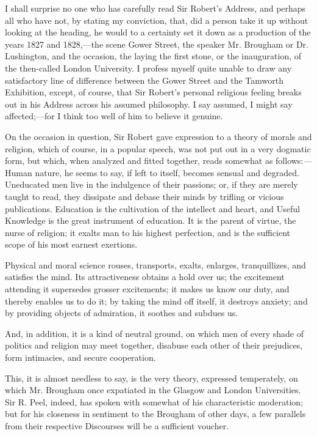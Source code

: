 I shall surprise no one who has carefully read Sir Robert's
Address, and perhaps all who have not, by stating my conviction, that,
did a person take it up without looking at the heading, he would to a
certainty set it down as a production of the years 1827 and 1828,—the
scene Gower Street, the speaker Mr. Brougham or Dr. Lushington, and
the occasion, the laying the first stone, or the inauguration, of the
then-called London University. I profess myself quite unable to draw
any satisfactory line of difference between the Gower Street and the
Tamworth Exhibition, except, of course, that Sir Robert's personal
religious feeling breaks out in his Address across his assumed
philosophy. I say assumed, I might say affected;—for I think too
well of him to believe it genuine.

On the occasion in question, Sir Robert gave expression to a theory
of morals and religion, which of course, in a popular speech, was not
put out in a very dogmatic form, but which, when analyzed and fitted
together, reads somewhat as follows:\emph{—}Human nature, he seems
to say, if left to itself, becomes sensual and degraded. Uneducated
men live in the indulgence of their passions; or, if they are merely
taught to read, they dissipate and debase their minds by trifling or
vicious publications. Education is the cultivation of the intellect
and heart, and Useful Knowledge is the great instrument of education.
It is the parent of virtue, the nurse of religion; it exalts man to
his highest perfection, and is the sufficient scope of his most
earnest exertions.

Physical and moral science rouses, transports, exalts, enlarges,
tranquillizes, and satisfies the mind. Its attractiveness obtains a
hold over us; the excitement attending it supersedes grosser
excitements; it makes us know our duty, and thereby enables us
to do it; by taking the mind off itself, it destroys anxiety; and by
providing objects of admiration, it soothes and subdues us.

And, in addition, it is a kind of neutral ground, on which men of
every shade of politics and religion may meet together, disabuse each
other of their prejudices, form intimacies, and secure cooperation.

This, it is almost needless to say, is the very theory, expressed
temperately, on which Mr. Brougham once expatiated in the Glasgow and
London Universities. Sir R. Peel, indeed, has spoken with somewhat of
his characteristic moderation; but for his closeness in sentiment to
the Brougham of other days, a few parallels from their respective
Discourses will be a sufficient voucher.

